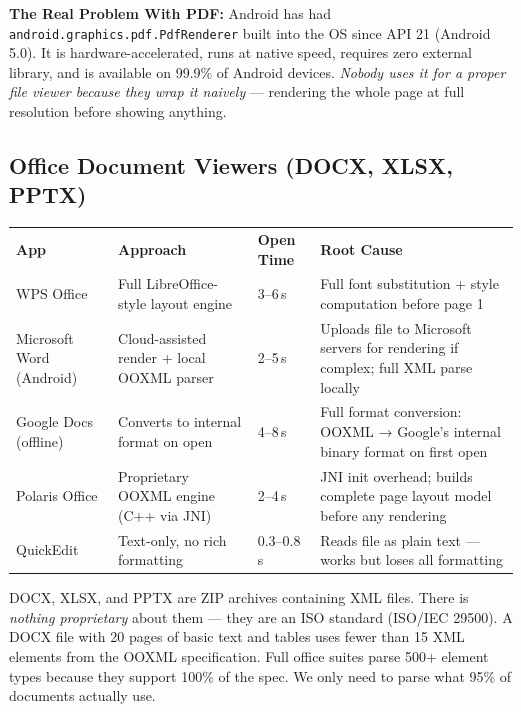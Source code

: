 \documentclass[12pt,a4paper]{report}
\newcommand{\ra}[1]{\renewcommand{\arraystretch}{#1}}
\newcommand{\TH}[1]{\rowcolor{P1}\color{white}\bfseries #1}
\begin{document}
\textbf{The Real Problem With PDF:} Android has had
\texttt{android.graphics.pdf.PdfRenderer} built into the OS since API 21
(Android 5.0). It is hardware-accelerated, runs at native speed, requires zero
external library, and is available on 99.9\% of Android devices. \emph{Nobody
uses it for a proper file viewer because they wrap it naively} — rendering the
whole page at full resolution before showing anything.

\subsection{Office Document Viewers (DOCX, XLSX, PPTX)}

\begin{center}\ra{1.35}
\begin{tabular}{L{3.0cm} L{3.0cm} L{2.4cm} L{5.4cm}}
\TH{App} & \TH{Approach} & \TH{Open Time} & \TH{Root Cause} \\
 WPS Office & Full LibreOffice-style layout engine & 3--6\,s &
  Full font substitution + style computation before page 1 \\
 Microsoft Word (Android) & Cloud-assisted render + local OOXML parser & 2--5\,s &
  Uploads file to Microsoft servers for rendering if complex; full XML parse locally \\
 Google Docs (offline) & Converts to internal format on open & 4--8\,s &
  Full format conversion: OOXML → Google's internal binary format on first open \\
 Polaris Office & Proprietary OOXML engine (C++ via JNI) & 2--4\,s &
  JNI init overhead; builds complete page layout model before any rendering \\
 QuickEdit & Text-only, no rich formatting & 0.3--0.8\,s &
  Reads file as plain text — works but loses all formatting \\
\end{tabular}
\end{center}

\begin{ibox}
DOCX, XLSX, and PPTX are ZIP archives containing XML files. There is
\emph{nothing proprietary} about them — they are an ISO standard (ISO/IEC 29500).
A DOCX file with 20 pages of basic text and tables uses fewer than 15 XML
elements from the OOXML specification. Full office suites parse 500+
element types because they support 100\% of the spec. We only need to
parse what 95\% of documents actually use.
\end{ibox}
\end{document}
